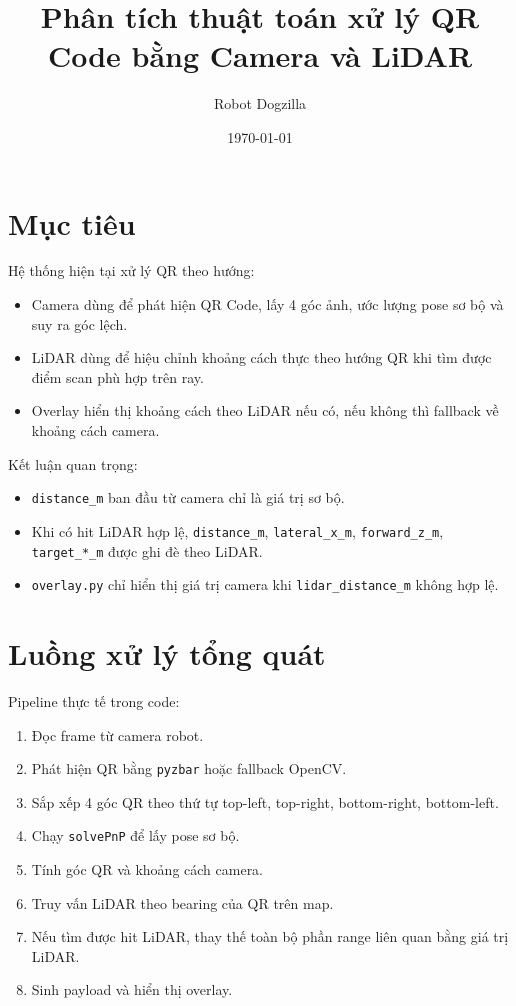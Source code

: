 \documentclass[12pt,a4paper]{article}
\title{Phân tích thuật toán xử lý QR Code bằng Camera và LiDAR}
\author{Robot Dogzilla}
\date{\today}
\begin{document}
\maketitle

\section{Mục tiêu}

Hệ thống hiện tại xử lý QR theo hướng:

\begin{itemize}
    \item Camera dùng để phát hiện QR Code, lấy 4 góc ảnh, ước lượng pose sơ bộ và suy ra góc lệch.
    \item LiDAR dùng để hiệu chỉnh khoảng cách thực theo hướng QR khi tìm được điểm scan phù hợp trên ray.
    \item Overlay hiển thị khoảng cách theo LiDAR nếu có, nếu không thì fallback về khoảng cách camera.
\end{itemize}

Kết luận quan trọng:

\begin{itemize}
    \item \texttt{distance\_m} ban đầu từ camera chỉ là giá trị sơ bộ.
    \item Khi có hit LiDAR hợp lệ, \texttt{distance\_m}, \texttt{lateral\_x\_m}, \texttt{forward\_z\_m}, \texttt{target\_*\_m} được ghi đè theo LiDAR.
    \item \texttt{overlay.py} chỉ hiển thị giá trị camera khi \texttt{lidar\_distance\_m} không hợp lệ.
\end{itemize}

\section{Luồng xử lý tổng quát}

Pipeline thực tế trong code:

\begin{enumerate}
    \item Đọc frame từ camera robot.
    \item Phát hiện QR bằng \texttt{pyzbar} hoặc fallback OpenCV.
    \item Sắp xếp 4 góc QR theo thứ tự top-left, top-right, bottom-right, bottom-left.
    \item Chạy \texttt{solvePnP} để lấy pose sơ bộ.
    \item Tính góc QR và khoảng cách camera.
    \item Truy vấn LiDAR theo bearing của QR trên map.
    \item Nếu tìm được hit LiDAR, thay thế toàn bộ phần range liên quan bằng giá trị LiDAR.
    \item Sinh payload và hiển thị overlay.
\end{enumerate}
\end{document}

